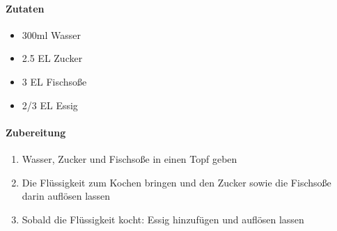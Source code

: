 \newpage
{}

\paragraph{Zutaten}	
\begin{itemize}[noitemsep]
	\item 300ml Wasser
	\item 2.5 EL Zucker
	\item 3 EL Fischsoße
	\item 2/3 EL Essig
\end{itemize}


\paragraph{Zubereitung}
\begin{enumerate}[noitemsep]
	\item Wasser, Zucker und Fischsoße in einen Topf geben
	\item Die Flüssigkeit zum Kochen bringen und den Zucker sowie die Fischsoße darin auflösen lassen
	\item Sobald die Flüssigkeit kocht: Essig hinzufügen und auflösen lassen
\end{enumerate}